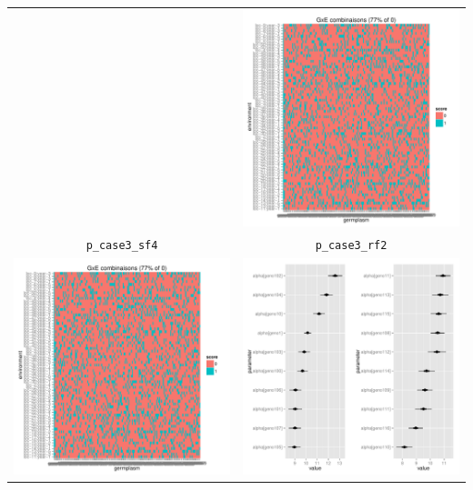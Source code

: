 \documentclass{article}\usepackage[]{graphicx}\usepackage[]{color}
\newenvironment{knitrout}{}{} %
\begin{document}
\begin{center}
\begin{tabular}{cc}
\begin{knitrout}
\end{knitrout}
&
\begin{knitrout}
\definecolor{shadecolor}{rgb}{0.969, 0.969, 0.969}\color{fgcolor}

{\centering \includegraphics[width=.4\textwidth]{figures/PPBstats_unnamed-chunk-32-1} 

}



\end{knitrout}
\\
\texttt{p\_case3\_sf4} & \texttt{p\_case3\_rf2} \\
\begin{knitrout}
\definecolor{shadecolor}{rgb}{0.969, 0.969, 0.969}\color{fgcolor}

{\centering \includegraphics[width=.4\textwidth]{figures/PPBstats_unnamed-chunk-33-1} 

}



\end{knitrout}
&
\begin{knitrout}
\definecolor{shadecolor}{rgb}{0.969, 0.969, 0.969}\color{fgcolor}

{\centering \includegraphics[width=.4\textwidth]{figures/PPBstats_unnamed-chunk-34-1} 

}



\end{knitrout}
\\
\end{tabular}
\end{center}
\end{document}
